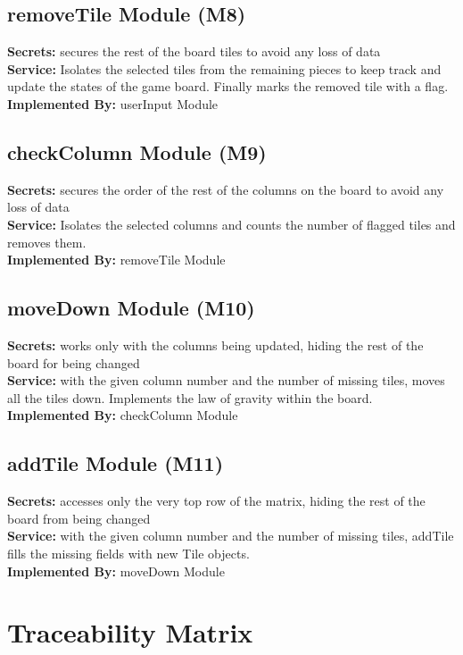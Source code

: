 \documentclass[12pt]{article}
\begin{document}
\subsection{removeTile Module (M8)}
\textbf{Secrets:} secures the rest of the board tiles to avoid any loss of data\\
\textbf{Service:} Isolates the selected tiles from the remaining pieces to keep track and update the states of the game board. Finally marks the removed tile with a flag.\\
\textbf{Implemented By:} userInput Module

\subsection{checkColumn Module (M9)}
\textbf{Secrets:} secures the order of the rest of the columns on the board to avoid any loss of data\\
\textbf{Service:} Isolates the selected columns and counts the number of flagged tiles and removes them.\\
\textbf{Implemented By:} removeTile Module

\subsection{moveDown Module (M10)}
\textbf{Secrets:} works only with the columns being updated, hiding the rest of the board for being changed\\
\textbf{Service:} with the given column number and the number of missing tiles, moves all the tiles down. Implements the law of gravity within the board.\\
\textbf{Implemented By:} checkColumn Module

\subsection{addTile Module (M11)}
\textbf{Secrets:} accesses only the very top row of the matrix, hiding the rest of the board from being changed\\
\textbf{Service:} with the given column number and the number of missing tiles, addTile fills the missing fields with new Tile objects.\\
\textbf{Implemented By:} moveDown Module

\section{Traceability Matrix} \label{SecTM}
\end{document}
